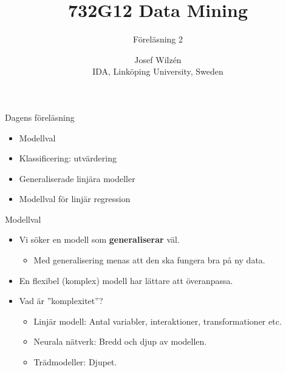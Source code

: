 \documentclass[10pt,english]{beamer}
\title{732G12 Data Mining}
\subtitle{Föreläsning 2}
\date{}
\author{Josef Wilzén \\ IDA, Linköping University, Sweden}
\begin{document}
\maketitle

\begin{frame}{Dagens föreläsning}
    
    \begin{itemize}
        \item Modellval
        \item Klassificering: utvärdering
        \item Generaliserade linjära modeller
        \item Modellval för linjär regression
    \end{itemize}

\end{frame}

\begin{frame}{Modellval}
    
    \begin{itemize}
        \item Vi söker en modell som \textbf{generaliserar} väl.
        \begin{itemize}
            \item Med generalisering menas att den ska fungera bra på ny data.
        \end{itemize}
        \item En flexibel (komplex) modell har lättare att överanpassa.
        \item Vad är ''komplexitet''?
        \begin{itemize}
            \item Linjär modell: Antal variabler, interaktioner, transformationer etc.
            \item Neurala nätverk: Bredd och djup av modellen.
            \item Trädmodeller: Djupet.
        \end{itemize}
    \end{itemize}

\end{frame}
\end{document}
